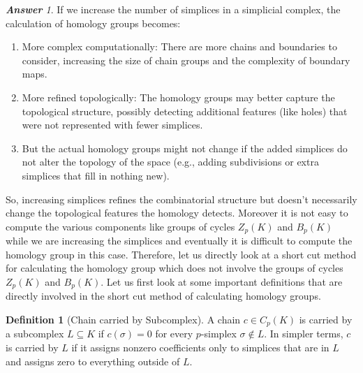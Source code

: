 \documentclass[12pt,oneside,reqno]{amsart}
\theoremstyle{plain}
\theoremstyle{definition}
\newtheorem{definition}[theorem]{Definition}
\theoremstyle{remark}
\newtheorem{answer}{\textbf{Answer}}
\newcommand{\0}{{\textbf{0}}}
\begin{document}
\begin{answer}
If we increase the number of simplices in a simplicial complex, the calculation of homology groups becomes:
\begin{enumerate}
    
\item More complex computationally: There are more chains and boundaries to consider, increasing the size of chain groups and the complexity of boundary maps.

\item  More refined topologically: The homology groups may better capture the topological structure, possibly detecting additional features (like holes) that were not represented with fewer simplices.

\item But the actual homology groups might not change if the added simplices do not alter the topology of the space (e.g., adding subdivisions or extra simplices that fill in nothing new).
\end{enumerate}
\end{answer}

So, increasing simplices refines the combinatorial structure but doesn't necessarily change the topological features the homology detects. Moreover it is not easy to compute the various components like groups of cycles $Z_{p}(K)$ and $B_{p}(K)$ while we are increasing the simplices and eventually it is difficult to compute the homology group in this case. Therefore, let us directly look at a short cut method for calculating the homology group which does not involve the groups of cycles $Z_{p}(K)$ and $B_{p}(K)$. Let us first look at some important definitions that are directly involved in the short cut method of calculating homology groups.

\begin{definition}[Chain carried by Subcomplex]\label{d:Chain carried by Subcomplex}
A chain $c \in C_p(K)$ is carried by a subcomplex $L \subseteq K$ if $c(\sigma) = 0$ for every $p$-simplex $\sigma \notin L$. In simpler terms, $c$ is carried by $L$ if it assigns nonzero coefficients only to simplices that are in $L$ and assigns zero to everything outside of $L$.
\end{definition}
\end{document}
